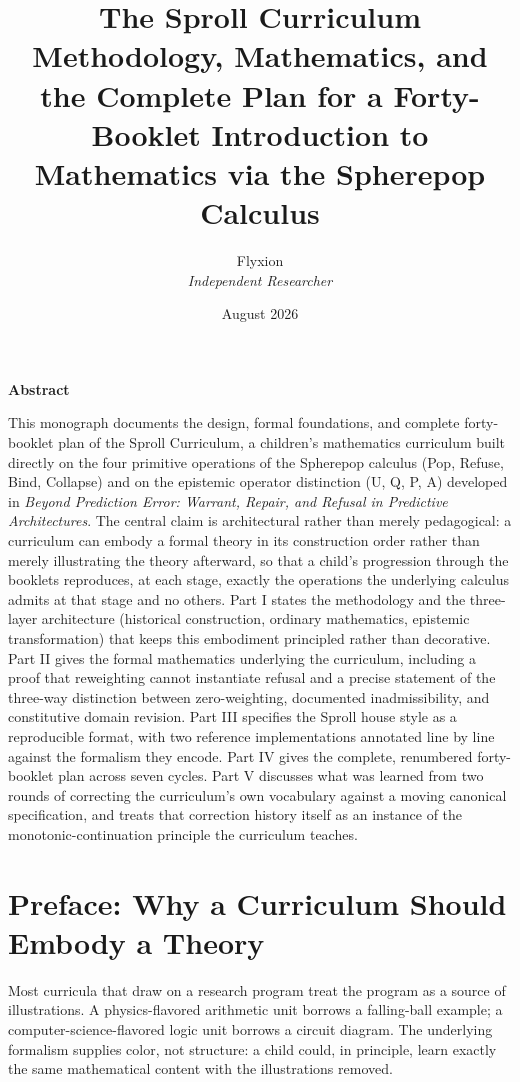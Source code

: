 \documentclass[11pt,twoside]{book}
\title{\textbf{The Sproll Curriculum}\\[0.3em]\Large Methodology, Mathematics, and the Complete Plan for a Forty-Booklet Introduction to Mathematics via the Spherepop Calculus}
\author{Flyxion\\ \textit{Independent Researcher}}
\date{August 2026}
\begin{document}
\frontmatter
\maketitle

\begin{center}
\textbf{Abstract}
\end{center}
\noindent This monograph documents the design, formal foundations, and complete forty-booklet plan of the Sproll Curriculum, a children's mathematics curriculum built directly on the four primitive operations of the Spherepop calculus (Pop, Refuse, Bind, Collapse) and on the epistemic operator distinction (U, Q, P, A) developed in \emph{Beyond Prediction Error: Warrant, Repair, and Refusal in Predictive Architectures}. The central claim is architectural rather than merely pedagogical: a curriculum can embody a formal theory in its construction order rather than merely illustrating the theory afterward, so that a child's progression through the booklets reproduces, at each stage, exactly the operations the underlying calculus admits at that stage and no others. Part I states the methodology and the three-layer architecture (historical construction, ordinary mathematics, epistemic transformation) that keeps this embodiment principled rather than decorative. Part II gives the formal mathematics underlying the curriculum, including a proof that reweighting cannot instantiate refusal and a precise statement of the three-way distinction between zero-weighting, documented inadmissibility, and constitutive domain revision. Part III specifies the Sproll house style as a reproducible format, with two reference implementations annotated line by line against the formalism they encode. Part IV gives the complete, renumbered forty-booklet plan across seven cycles. Part V discusses what was learned from two rounds of correcting the curriculum's own vocabulary against a moving canonical specification, and treats that correction history itself as an instance of the monotonic-continuation principle the curriculum teaches.
\vspace{1em}

\tableofcontents

\chapter*{Preface: Why a Curriculum Should Embody a Theory}

Most curricula that draw on a research program treat the program as a source of illustrations. A physics-flavored arithmetic unit borrows a falling-ball example; a computer-science-flavored logic unit borrows a circuit diagram. The underlying formalism supplies color, not structure: a child could, in principle, learn exactly the same mathematical content with the illustrations removed.
\end{document}
